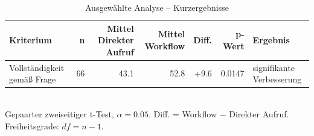 \begin{table}[htbp]
\centering
\caption{Ausgewählte Analyse -- Kurzergebnisse}
\begin{tabular}{lrrrrrl}
\toprule
Kriterium & n & Mittel Direkter Aufruf & Mittel Workflow & Diff. & p-Wert & Ergebnis \\
\midrule
Vollständigkeit gemäß Frage & 66 & 43.1 & 52.8 & +9.6 & 0.0147 & signifikante Verbesserung \\
\bottomrule
\end{tabular}
\\[2mm]
\footnotesize Gepaarter zweiseitiger t-Test, $\alpha=0.05$. Diff. = Workflow $-$ Direkter Aufruf. Freiheitsgrade: $df=n-1$.
\end{table}
